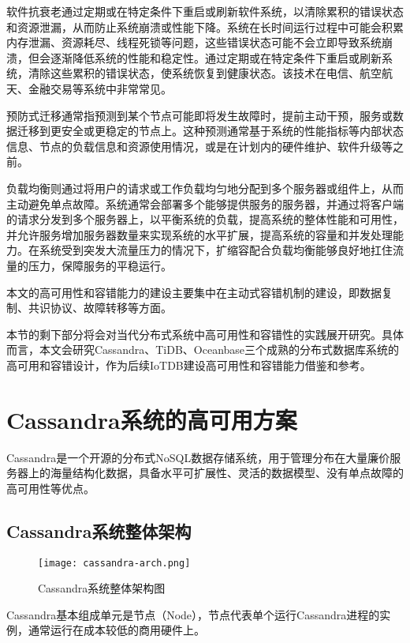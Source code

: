 软件抗衰老通过定期或在特定条件下重启或刷新软件系统，以清除累积的错误状态和资源泄漏，从而防止系统崩溃或性能下降。系统在长时间运行过程中可能会积累内存泄漏、资源耗尽、线程死锁等问题，这些错误状态可能不会立即导致系统崩溃，但会逐渐降低系统的性能和稳定性。通过定期或在特定条件下重启或刷新系统，清除这些累积的错误状态，使系统恢复到健康状态。该技术在电信、航空航天、金融交易等系统中非常常见。

预防式迁移通常指预测到某个节点可能即将发生故障时，提前主动干预，服务或数据迁移到更安全或更稳定的节点上。这种预测通常基于系统的性能指标等内部状态信息、节点的负载信息和资源使用情况，或是在计划内的硬件维护、软件升级等之前。

负载均衡则通过将用户的请求或工作负载均匀地分配到多个服务器或组件上，从而主动避免单点故障。系统通常会部署多个能够提供服务的服务器，并通过将客户端的请求分发到多个服务器上，以平衡系统的负载，提高系统的整体性能和可用性，并允许服务增加服务器数量来实现系统的水平扩展，提高系统的容量和并发处理能力。在系统受到突发大流量压力的情况下，扩缩容配合负载均衡能够良好地扛住流量的压力，保障服务的平稳运行。



本文的高可用性和容错能力的建设主要集中在主动式容错机制的建设，即数据复制、共识协议、故障转移等方面。

本节的剩下部分将会对当代分布式系统中高可用性和容错性的实践展开研究。具体而言，本文会研究Cassandra、TiDB、Oceanbase三个成熟的分布式数据库系统的高可用和容错设计，作为后续IoTDB建设高可用性和容错能力借鉴和参考。



\section{Cassandra系统的高可用方案}
Cassandra\cite{lakshman2010cassandra}是一个开源的分布式NoSQL数据存储系统，用于管理分布在大量廉价服务器上的海量结构化数据，具备水平可扩展性、灵活的数据模型、没有单点故障的高可用性等优点。

\subsection{Cassandra系统整体架构}

\begin{figure}
  \centering
  \texttt{[image: cassandra-arch.png]}
  \caption{Cassandra系统整体架构图}
  \label{fig:cassandra-arch}
\end{figure}

Cassandra基本组成单元是节点（Node），节点代表单个运行Cassandra进程的实例，通常运行在成本较低的商用硬件上。

